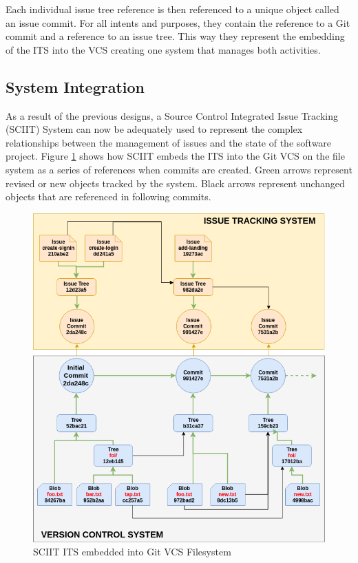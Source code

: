 \documentclass{mproj}
\begin{document}
Each individual issue tree reference is then referenced to a unique object called an issue commit. For all intents and purposes, they contain the reference to a Git commit and a reference to an issue tree. This way they represent the embedding of the ITS into the VCS creating one system that manages both activities.


\subsection{System Integration}

As a result of the previous designs, a Source Control Integrated Issue Tracking (SCIIT) System can now be adequately used to represent the complex relationships between the management of issues and the state of the software project. Figure \ref{fig:sciit-filesystem} shows how SCIIT embeds the ITS into the Git VCS on the file system as a series of references when commits are created. Green arrows represent revised or new objects tracked by the system. Black arrows represent unchanged objects that are referenced in following commits.


\begin{figure}[h!]
\caption{SCIIT ITS embedded into Git VCS Filesystem}
\label{fig:sciit-filesystem}
\centering
\includegraphics[width=12cm]{sciit-filesystem}
\end{figure}
\end{document}
